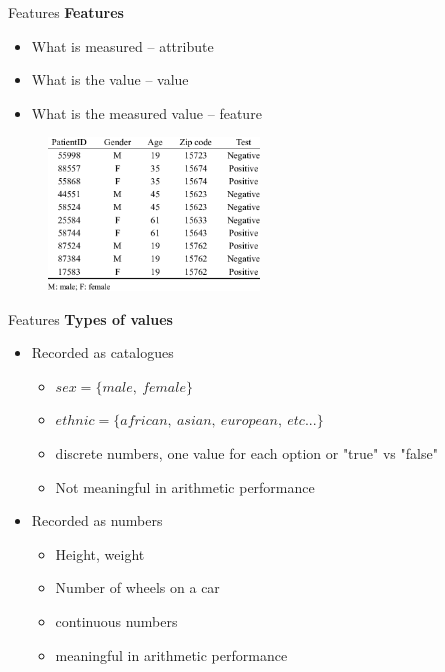 \documentclass{beamer}
\begin{document}
\begin{frame}{Features}
\textbf{Features}
\begin{itemize}
\item What is measured -- attribute
\item What is the value -- value
\item What is the measured value -- feature
\end{itemize}
\begin{figure}
\centering
\includegraphics[width=5.6cm]{ep3.png}
\end{figure}
\end{frame}

\begin{frame}{Features}
\textbf{Types of values}
\begin{itemize}
\item Recorded as catalogues 
\begin{itemize}
\item $sex = \{ male, \ female\}$
\item $ethnic = \{african,\ asian, \ european,\ etc...\}$
\item discrete numbers, one value for each option or "true" vs "false"
\item Not meaningful in arithmetic performance 
\end{itemize}
\item Recorded as numbers
\begin{itemize}
\item Height, weight
\item Number of wheels on a car
\item continuous numbers
\item meaningful in arithmetic performance
\end{itemize}
\end{itemize}
\end{frame}
\end{document}
